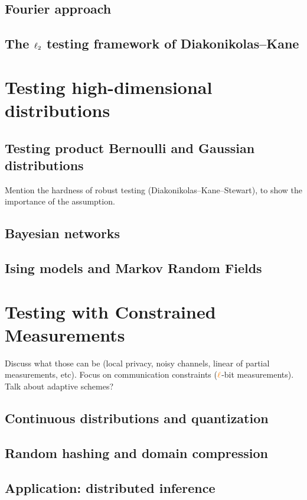 \documentclass[biber]{nowfnt} %
\begin{document}
\section{Fourier approach}
\section{The $\lp[2]$ testing framework of Diakonikolas--Kane}

\chapter{Testing high-dimensional distributions}

\section{Testing product Bernoulli and Gaussian distributions}
Mention the hardness of robust testing (Diakonikolas--Kane--Stewart),
to show the importance of the assumption.

\section{Bayesian networks}
\section{Ising models and Markov Random Fields}

\chapter{Testing with Constrained Measurements}
Discuss what those can be (local privacy, noisy channels, linear of
partial measurements, etc). Focus on communication constraints ($\numbits$-bit
measurements). Talk about adaptive schemes?
\section{Continuous distributions and quantization}
\section{Random hashing and domain compression}
\section{Application: distributed inference}
\end{document}
